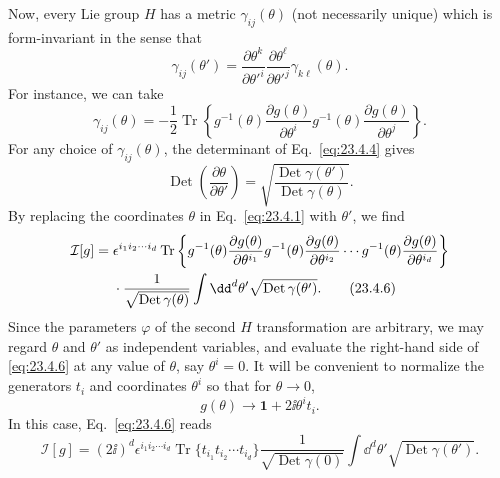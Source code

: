 Now, every Lie group $H$ has a metric $\gamma_{ij}(\theta)$ (not
necessarily unique) which is form-invariant in the sense that
\begin{equation}
\gamma_{ij}(\theta')
=\frac{\partial\theta^k}{\partial\theta'^i}
\frac{\partial\theta^\ell}{\partial\theta'^j}
\gamma_{k\ell}(\theta).
\tag{23.4.4}\label{eq:23.4.4}
\end{equation}
For instance, we can take
\begin{equation}
\gamma_{ij}(\theta)=-\frac12\operatorname{Tr}\left\{
g^{-1}(\theta)\frac{\partial g(\theta)}{\partial\theta^i}
g^{-1}(\theta)\frac{\partial g(\theta)}{\partial\theta^j}
\right\}.
\tag{23.4.5}\label{eq:23.4.5}
\end{equation}
For any choice of $\gamma_{ij}(\theta)$, the determinant of
Eq.~\eqref{eq:23.4.4} gives
\[
\operatorname{Det}\left(\frac{\partial\theta}{\partial\theta'}\right)
=\sqrt{\frac{\operatorname{Det}\gamma(\theta')}
{\operatorname{Det}\gamma(\theta)}}.
\]
By replacing the coordinates $\theta$ in Eq.~\eqref{eq:23.4.1} with
$\theta'$, we find
\begin{align}
\mathcal I[g]={}&
\epsilon^{i_1i_2\cdots i_d}\operatorname{Tr}\left\{
g^{-1}(\theta)\frac{\partial g(\theta)}{\partial\theta^{i_1}}
g^{-1}(\theta)\frac{\partial g(\theta)}{\partial\theta^{i_2}}
\cdots
g^{-1}(\theta)\frac{\partial g(\theta)}{\partial\theta^{i_d}}
\right\}
\notag\\
&{}\cdot\frac{1}{\sqrt{\operatorname{Det}\gamma(\theta)}}
\int \dd^d\theta'\sqrt{\operatorname{Det}\gamma(\theta')}.
\tag{23.4.6}\label{eq:23.4.6}
\end{align}
Since the parameters $\varphi$ of the second $H$ transformation are
arbitrary, we may regard $\theta$ and $\theta'$ as independent variables,
and evaluate the right-hand side of \eqref{eq:23.4.6} at any value of
$\theta$, say $\theta^i=0$. It will be convenient to normalize the
generators $t_i$ and coordinates $\theta^i$ so that for $\theta\to0$,
\begin{equation}
g(\theta)\longrightarrow \mathbf{1}+2\ii\theta^it_i.
\tag{23.4.7}\label{eq:23.4.7}
\end{equation}
In this case, Eq.~\eqref{eq:23.4.6} reads
\begin{equation}
\mathcal I[g]=(2\ii)^d\epsilon^{i_1i_2\cdots i_d}
\operatorname{Tr}\{t_{i_1}t_{i_2}\cdots t_{i_d}\}
\frac{1}{\sqrt{\operatorname{Det}\gamma(0)}}
\int \dd^d\theta'\sqrt{\operatorname{Det}\gamma(\theta')}.
\tag{23.4.8}\label{eq:23.4.8}
\end{equation}

